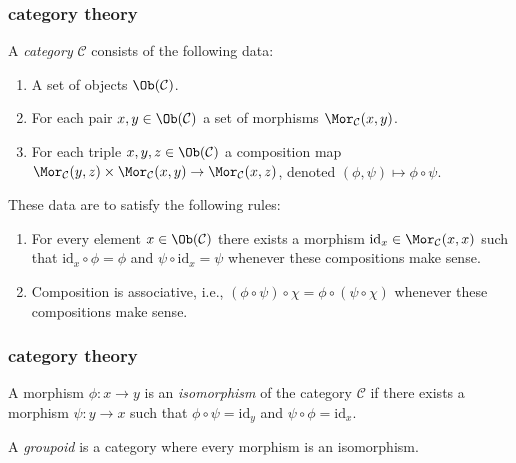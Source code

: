 \begin{frame}
\frametitle{category theory}
	\begin{definition}
	A {\it category} $\mathcal{C}$ consists of the following data:
		\begin{enumerate}
			\pause \item A set of objects $\Ob(\mathcal{C})$.
			\pause \item For each pair $x, y \in \Ob(\mathcal{C})$ a set of morphisms
			$\Mor_\mathcal{C}(x, y)$.
			\pause \item For each triple $x, y, z\in \Ob(\mathcal{C})$ a composition
			map $ \Mor_\mathcal{C}(y, z) \times \Mor_\mathcal{C}(x, y)
			\to \Mor_\mathcal{C}(x, z) $, denoted $(\phi, \psi) \mapsto
			\phi \circ \psi$.
			\end{enumerate}
			\pause These data are to satisfy the following rules:
			\begin{enumerate}
			\pause \item For every element $x\in \Ob(\mathcal{C})$ there exists a
			morphism $\text{id}_x\in \Mor_\mathcal{C}(x, x)$ such that
			$\text{id}_x \circ \phi = \phi$ and $\psi \circ \text{id}_x = \psi $ whenever
			these compositions make sense.
			\pause \item Composition is associative, i.e., $(\phi \circ \psi) \circ \chi =
			\phi \circ ( \psi \circ \chi)$ whenever these compositions make sense.
		\end{enumerate}
	\end{definition}
\end{frame}

\begin{frame}
\frametitle{category theory}
	\begin{definition}
	\label{definition-isomorphism}
		A morphism $\phi : x \to y$ is an {\it isomorphism} of the category
		$\mathcal{C}$ if there exists a morphism $\psi : y \to x$
		such that $\phi \circ \psi = \text{id}_y$ and
		$\psi \circ \phi = \text{id}_x$.
	\end{definition}
	
	\begin{definition}
	\label{definition-groupoid}
		A {\it groupoid} is a category where every morphism is an isomorphism.
	\end{definition}
\end{frame}

